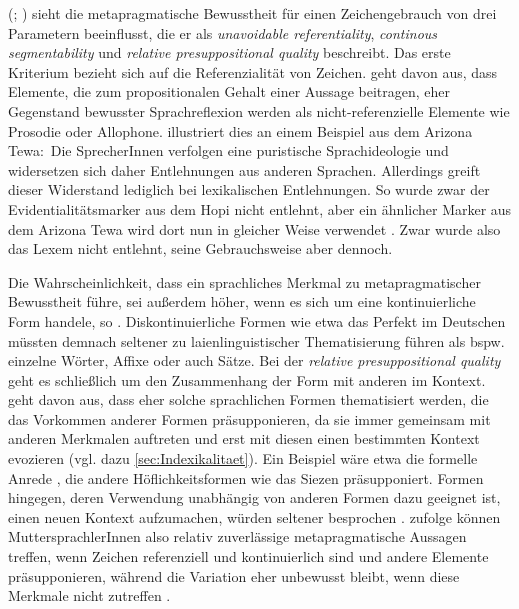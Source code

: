 \citeauthor{Silverstein.1981} (\citeyear[4]{Silverstein.1981}; \citeyear[s. auch][41]{Silverstein.1976}) sieht die metapragmatische Bewusstheit für einen Zeichengebrauch von drei Parametern beeinflusst, die er als \textit{unavoidable referentiality}, \textit{continous segmentability} und \textit{relative presuppositional quality} beschreibt.
Das erste Kriterium bezieht sich auf die Referenzialität von Zeichen.
\citet[5]{Silverstein.1981} geht davon aus, dass Elemente, die zum propositionalen Gehalt einer Aussage beitragen, eher Gegenstand bewusster Sprachreflexion werden als nicht-referenzielle Elemente wie Prosodie oder Allophone.
\citet[506--507]{Kroskrity.2004} illustriert dies an einem Beispiel aus dem Arizona Tewa:~Die SprecherInnen verfolgen eine puristische Sprachideologie und widersetzen sich daher Entlehnungen aus anderen Sprachen. 
Allerdings greift dieser Widerstand lediglich bei lexikalischen Entlehnungen. 
So wurde zwar der Evidentialitätsmarker  aus dem Hopi nicht entlehnt, aber ein ähnlicher Marker aus dem Arizona Tewa wird dort nun in gleicher Weise verwendet \citep[s.][507]{Kroskrity.2004}.
Zwar wurde also das Lexem nicht entlehnt, seine Gebrauchsweise aber dennoch.

Die Wahrscheinlichkeit, dass ein sprachliches Merkmal zu metapragmatischer Bewusstheit führe, sei außerdem höher, wenn es sich um eine kontinuierliche Form handele, so \citet[6]{Silverstein.1981}. 
Diskontinuierliche Formen wie etwa das Perfekt im Deutschen müssten demnach seltener zu laienlinguistischer Thematisierung führen als bspw. einzelne Wörter, Affixe oder auch Sätze. 
Bei der \textit{relative presuppositional quality} geht es schließlich um den Zusammenhang der Form mit anderen im Kontext. 
\citet[6--7]{Silverstein.1981} geht davon aus, dass eher solche sprachlichen Formen thematisiert werden, die das Vorkommen anderer Formen präsupponieren, da sie immer gemeinsam mit anderen Merkmalen auftreten und erst mit diesen einen bestimmten Kontext evozieren (vgl. dazu \autoref{sec:Indexikalitaet}). 
Ein Beispiel wäre etwa die formelle Anrede , die andere Höflichkeitsformen wie das Siezen präsupponiert.  
Formen hingegen, deren Verwendung unabhängig von anderen Formen dazu geeignet ist, einen neuen Kontext aufzumachen, würden seltener besprochen \citep[7]{Silverstein.1981}. 
\citet[5--8]{Silverstein.1981} zufolge k{\"o}nnen MuttersprachlerInnen  also relativ zuverl{\"a}ssige metapragmatische Aussagen treffen, wenn Zeichen referenziell und kontinuierlich sind und andere Elemente präsupponieren, w{\"a}hrend die Variation eher unbewusst bleibt, wenn diese Merkmale nicht zutreffen \citep[vgl. auch][49]{Silverstein.1976}. 

